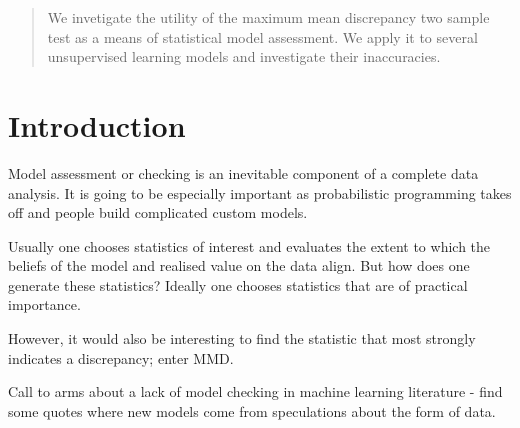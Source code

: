 \documentclass{article}
\begin{document}
 


\begin{abstract} 
We invetigate the utility of the maximum mean discrepancy two sample test as a means of statistical model assessment.
We apply it to several unsupervised learning models and investigate their inaccuracies.
\end{abstract} 

\allowdisplaybreaks

\section{Introduction}


Model assessment or checking is an inevitable component of a complete data analysis.
It is going to be especially important as probabilistic programming takes off and people build complicated custom models.

Usually one chooses statistics of interest and evaluates the extent to which the beliefs of the model and realised value on the data align.
But how does one generate these statistics?
Ideally one chooses statistics that are of practical importance.

However, it would also be interesting to find the statistic that most strongly indicates a discrepancy; enter MMD.

Call to arms about a lack of model checking in machine learning literature - find some quotes where new models come from speculations about the form of data.
\end{document}
